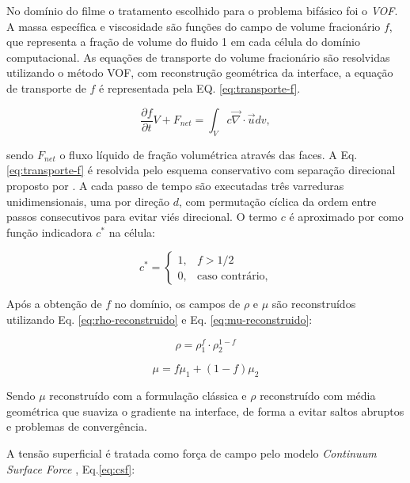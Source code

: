 No domínio do filme o tratamento escolhido para o problema bifásico foi o \textit{VOF}.
A massa específica e viscosidade são funções do campo de volume fracionário $f$, que representa a fração de volume do fluido 1 em cada célula do domínio computacional. As equações de transporte do volume fracionário são resolvidas utilizando o método VOF, com reconstrução geométrica da interface, a equação de transporte de $f$ é representada pela EQ. \ref{eq:transporte-f}.

\begin{equation}
    \frac{\partial f}{\partial t} V + F_{net} = \int_{V} c \vec{\nabla} \cdot \vec{u} dv,
    \label{eq:transporte-f}
\end{equation}

sendo $F_{net}$ o fluxo líquido de fração volumétrica através das faces.
A Eq. \ref{eq:transporte-f} é resolvida pelo esquema conservativo com separação direcional proposto por \citet{Weymouth2010}. A cada passo de tempo são executadas três varreduras unidimensionais, uma por direção $d$, com permutação cíclica da ordem entre passos consecutivos para evitar viés direcional. O termo $c$ é aproximado por \citet{Weymouth2010} como função indicadora $c^*$ na célula:

\begin{equation}
    c^* =
    \begin{cases}
        1, & f > 1/2 \\
        0, & \text{caso contrário,}
    \end{cases}
    \label{eq:indicadora-wy}
\end{equation}


Após a obtenção de $f$ no domínio, os campos de $\rho$ e $\mu$ são reconstruídos utilizando Eq. \ref{eq:rho-reconstruido} e Eq. \ref{eq:mu-reconstruido}:

\begin{equation}
    \rho = \rho_1^f \cdot \rho_2^{1-f}
    \label{eq:rho-reconstruido}
\end{equation}

\begin{equation}
    \mu = f \mu_1 + (1-f) \mu_2
    \label{eq:mu-reconstruido}
\end{equation}

Sendo $\mu$ reconstruído com a formulação clássica e $\rho$ reconstruído com média geométrica que suaviza o gradiente na interface, de forma a evitar saltos abruptos e problemas de convergência. 

A tensão superficial é tratada como força de campo pelo modelo \textit{Continuum Surface Force} \citep{Brackbill1992}, Eq.\ref{eq:csf}: 

